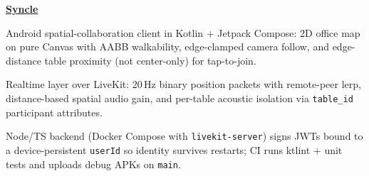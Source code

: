 \begin{twocolentry}{}
\href{https://github.com/faketut/Syncle}{\textbf{Syncle}}
\end{twocolentry}
\begin{onecolentry}
\begin{highlights}
\item Android spatial-collaboration client in Kotlin + Jetpack Compose: 2D office map on pure Canvas with AABB walkability, edge-clamped camera follow, and edge-distance table proximity (not center-only) for tap-to-join.
\item Realtime layer over LiveKit: 20\,Hz binary position packets with remote-peer lerp, distance-based spatial audio gain, and per-table acoustic isolation via \texttt{table\_id} participant attributes.
\item Node/TS backend (Docker Compose with \texttt{livekit-server}) signs JWTs bound to a device-persistent \texttt{userId} so identity survives restarts; CI runs ktlint + unit tests and uploads debug APKs on \texttt{main}.
\end{highlights}
\end{onecolentry}
